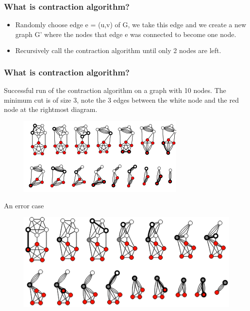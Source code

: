 \documentclass{beamer}
\begin{document}
\begin{frame}
\frametitle{What is contraction algorithm? }
\begin{itemize}
	\item Randomly choose edge e = (u,v) of G, we take this edge and we create a new graph G' where the nodes that edge e was connected to become one node. 
	\item Recursively call the contraction algorithm until only 2 nodes are left. 
	
\end{itemize}


\end{frame}


\begin{frame}
\frametitle{What is contraction algorithm? }


Successful run of the contraction algorithm on a graph with 10 nodes.  The minimum cut is of size 3, note the 3 edges between the white node and the red node at the rightmost diagram.
\begin{figure}
	\includegraphics[scale=0.5]{kargers_diagram}
\end{figure}
An error case
\begin{figure}
	\includegraphics[scale=0.3]{images/error_case}
\end{figure}
\end{frame}
\end{document}
